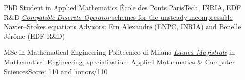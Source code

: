 \documentclass[english]{RMcv}
\begin{document}






%
%


%
        {PhD Student in Applied Mathematics}%
        {\'Ecole des Ponts ParisTech, INRIA, EDF R\&D}%
        {\href{https://tel.archives-ouvertes.fr/tel-03080530}{\emph{Compatible Discrete Operator} schemes for the unsteady incompressible Navier–Stokes equations}}%
        {Advisors: Ern Alexandre (ENPC, INRIA) and Bonelle J\'er\^ome (EDF R\&D)}

%
        {MSc in Mathematical Engineering}%
        {Politecnico di Milano}%
        {\href{https://www.politesi.polimi.it/handle/10589/133692}{\emph{Laurea Magistrale}} in Mathematical Engineering, specialization: Applied Mathematics \& Computer Sciences}{Score: 110 and honors/110}
\end{document}
